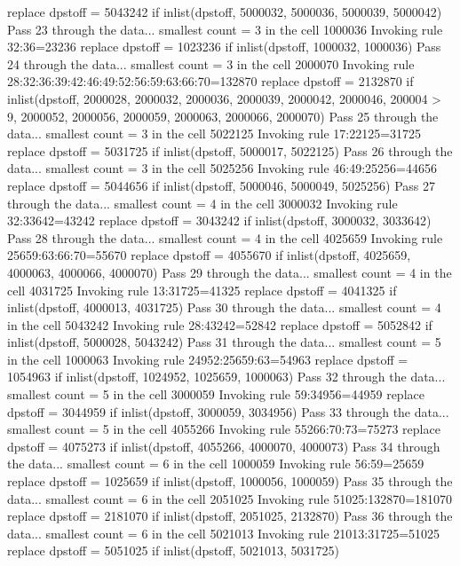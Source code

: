   replace dpstoff = 5043242 if inlist(dpstoff, 5000032, 5000036, 5000039, 5000042)
Pass 23 through the data...
  smallest count = 3 in the cell      1000036
  Invoking rule 32:36=23236
  replace dpstoff = 1023236 if inlist(dpstoff, 1000032, 1000036)
Pass 24 through the data...
  smallest count = 3 in the cell      2000070
  Invoking rule 28:32:36:39:42:46:49:52:56:59:63:66:70=132870
  replace dpstoff = 2132870 if inlist(dpstoff, 2000028, 2000032, 2000036, 2000039, 2000042, 2000046, 200004
> 9, 2000052, 2000056, 2000059, 2000063, 2000066, 2000070)
Pass 25 through the data...
  smallest count = 3 in the cell      5022125
  Invoking rule 17:22125=31725
  replace dpstoff = 5031725 if inlist(dpstoff, 5000017, 5022125)
Pass 26 through the data...
  smallest count = 3 in the cell      5025256
  Invoking rule 46:49:25256=44656
  replace dpstoff = 5044656 if inlist(dpstoff, 5000046, 5000049, 5025256)
Pass 27 through the data...
  smallest count = 4 in the cell      3000032
  Invoking rule 32:33642=43242
  replace dpstoff = 3043242 if inlist(dpstoff, 3000032, 3033642)
Pass 28 through the data...
  smallest count = 4 in the cell      4025659
  Invoking rule 25659:63:66:70=55670
  replace dpstoff = 4055670 if inlist(dpstoff, 4025659, 4000063, 4000066, 4000070)
Pass 29 through the data...
  smallest count = 4 in the cell      4031725
  Invoking rule 13:31725=41325
  replace dpstoff = 4041325 if inlist(dpstoff, 4000013, 4031725)
Pass 30 through the data...
  smallest count = 4 in the cell      5043242
  Invoking rule 28:43242=52842
  replace dpstoff = 5052842 if inlist(dpstoff, 5000028, 5043242)
Pass 31 through the data...
  smallest count = 5 in the cell      1000063
  Invoking rule 24952:25659:63=54963
  replace dpstoff = 1054963 if inlist(dpstoff, 1024952, 1025659, 1000063)
Pass 32 through the data...
  smallest count = 5 in the cell      3000059
  Invoking rule 59:34956=44959
  replace dpstoff = 3044959 if inlist(dpstoff, 3000059, 3034956)
Pass 33 through the data...
  smallest count = 5 in the cell      4055266
  Invoking rule 55266:70:73=75273
  replace dpstoff = 4075273 if inlist(dpstoff, 4055266, 4000070, 4000073)
Pass 34 through the data...
  smallest count = 6 in the cell      1000059
  Invoking rule 56:59=25659
  replace dpstoff = 1025659 if inlist(dpstoff, 1000056, 1000059)
Pass 35 through the data...
  smallest count = 6 in the cell      2051025
  Invoking rule 51025:132870=181070
  replace dpstoff = 2181070 if inlist(dpstoff, 2051025, 2132870)
Pass 36 through the data...
  smallest count = 6 in the cell      5021013
  Invoking rule 21013:31725=51025
  replace dpstoff = 5051025 if inlist(dpstoff, 5021013, 5031725)
